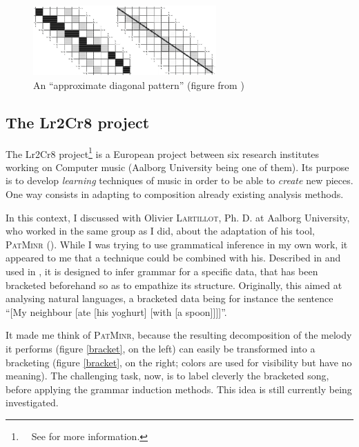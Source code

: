 \documentclass[a4paper,10pt]{article}
\newcommand{\guill}[1]{``#1''}
\begin{document}
\begin{figure}
\centering
\includegraphics[width=7cm]{images/aucouturier.jpg}
\caption{An \guill{approximate diagonal pattern} (figure from \cite{aucouturier2002finding}) \label{aucouturier}}
\end{figure}

\subsection{The Lr2Cr8 project}

The Lr2Cr8 project\footnote{~~See \cite{Lrn2Cre8} for more information.} is a European project between six research institutes working on Computer music (Aalborg University being one of them). Its purpose is to develop \emph{learning} techniques of music in order to be able to \emph{create} new pieces. One way consists in adapting to composition already existing analysis methods.

In this context, I discussed with Olivier \textsc{Lartillot}, Ph. D. at Aalborg University, who worked in the same group as I did, about the adaptation of his tool, \textsc{PatMinr} (\cite{patminr}).
While I was trying to use grammatical inference in my own work, it appeared to me that a technique could be combined with his. Described in \cite{bracket2} and used in \cite{bracket1}, it is designed to infer grammar for a specific data, that has been bracketed beforehand so as to empathize its structure. Originally, this aimed at analysing natural languages, a bracketed data being for instance the sentence \guill{[My neighbour [ate [his yoghurt] [with [a spoon]]]]}.

It made me think of \textsc{PatMinr}, because the resulting decomposition of the melody it performs (figure \ref{bracket}, on the left) can easily be transformed into a bracketing (figure \ref{bracket}, on the right; colors are used for visibility but have no meaning). The challenging task, now, is to label cleverly the bracketed song, before applying the grammar induction methods. This idea is still currently being investigated.
\end{document}
